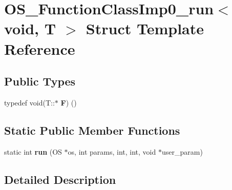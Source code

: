 \hypertarget{struct_o_s___function_class_imp0__run_3_01void_00_01_t_01_01_01_01_01_01_01_01_01_01_01_01_01_01fd1f430a3a120170cc58b1ea65e7fdbe}{}\section{O\+S\+\_\+\+Function\+Class\+Imp0\+\_\+run$<$ void, T $>$ Struct Template Reference}
\label{struct_o_s___function_class_imp0__run_3_01void_00_01_t_01_01_01_01_01_01_01_01_01_01_01_01_01_01fd1f430a3a120170cc58b1ea65e7fdbe}
\subsection*{Public Types}
\begin{DoxyCompactItemize}
\item 
typedef void(T\+::$\ast$ {\bfseries F}) ()\hypertarget{struct_o_s___function_class_imp0__run_3_01void_00_01_t_01_01_01_01_01_01_01_01_01_01_01_01_01_01fd1f430a3a120170cc58b1ea65e7fdbe_a17da50bd5564d359a1b136dab501083d}{}\label{struct_o_s___function_class_imp0__run_3_01void_00_01_t_01_01_01_01_01_01_01_01_01_01_01_01_01_01fd1f430a3a120170cc58b1ea65e7fdbe_a17da50bd5564d359a1b136dab501083d}

\end{DoxyCompactItemize}
\subsection*{Static Public Member Functions}
\begin{DoxyCompactItemize}
\item 
static int {\bfseries run} (OS $\ast$os, int params, int, int, void $\ast$user\+\_\+param)\hypertarget{struct_o_s___function_class_imp0__run_3_01void_00_01_t_01_01_01_01_01_01_01_01_01_01_01_01_01_01fd1f430a3a120170cc58b1ea65e7fdbe_a2c4d74e6035a1b9313a3cd58d527bfdc}{}\label{struct_o_s___function_class_imp0__run_3_01void_00_01_t_01_01_01_01_01_01_01_01_01_01_01_01_01_01fd1f430a3a120170cc58b1ea65e7fdbe_a2c4d74e6035a1b9313a3cd58d527bfdc}

\end{DoxyCompactItemize}


\subsection{Detailed Description}
